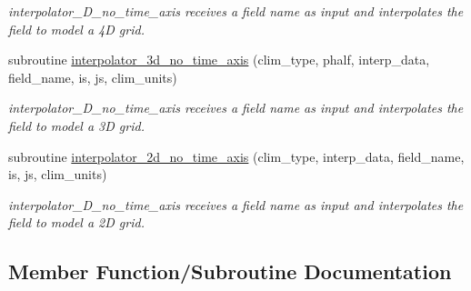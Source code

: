 \begin{DoxyCompactItemize}
\begin{DoxyCompactList}\small\item\em interpolator\+\_\+D\+\_\+no\+\_\+time\+\_\+axis receives a field name as input and interpolates the field to model a 4D grid. \end{DoxyCompactList}\item 
subroutine \hyperlink{interfaceinterpolator__mod_1_1interpolator_ab6c66439c87afee2373fe8fa164b138b}{interpolator\+\_\+3d\+\_\+no\+\_\+time\+\_\+axis} (clim\+\_\+type, phalf, interp\+\_\+data, field\+\_\+name, is, js, clim\+\_\+units)
\begin{DoxyCompactList}\small\item\em interpolator\+\_\+D\+\_\+no\+\_\+time\+\_\+axis receives a field name as input and interpolates the field to model a 3D grid. \end{DoxyCompactList}\item 
subroutine \hyperlink{interfaceinterpolator__mod_1_1interpolator_a4a8d87918b5abb9c6765a83d412557be}{interpolator\+\_\+2d\+\_\+no\+\_\+time\+\_\+axis} (clim\+\_\+type, interp\+\_\+data, field\+\_\+name, is, js, clim\+\_\+units)
\begin{DoxyCompactList}\small\item\em interpolator\+\_\+D\+\_\+no\+\_\+time\+\_\+axis receives a field name as input and interpolates the field to model a 2D grid. \end{DoxyCompactList}\end{DoxyCompactItemize}


\subsection{Member Function/\+Subroutine Documentation}
\mbox{\label{interfaceinterpolator__mod_1_1interpolator_ac82067012c474cd9d2a28e09e0f4e6d0}} 
